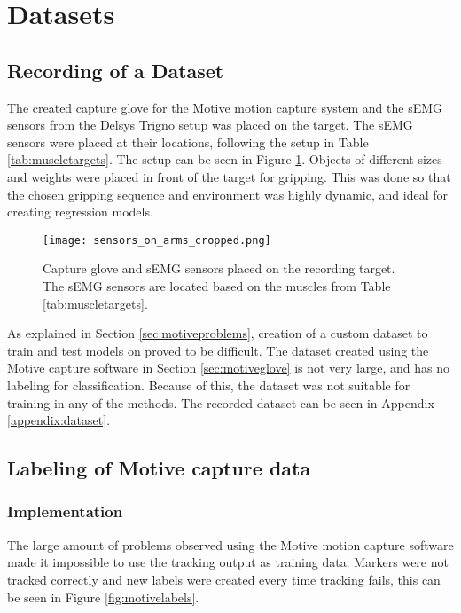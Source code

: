 \documentclass[../main.tex]{subfiles}
\begin{document}
\section{Datasets}

\subsection{Recording of a Dataset}

The created capture glove for the Motive motion capture system \cite{motive} and the sEMG sensors from the Delsys Trigno \cite{trigno} setup was placed on the target.
The sEMG sensors were placed at their locations, following the setup in Table \ref{tab:muscletargets}.
The setup can be seen in Figure \ref{fig:musclesensorsonarm}.
Objects of different sizes and weights were placed in front of the target for gripping. 
This was done so that the chosen gripping sequence and environment was highly dynamic, and ideal for creating regression models.

\begin{figure}[H]
\begin{center}
\texttt{[image: sensors\_on\_arms\_cropped.png]}
\caption{Capture glove and sEMG sensors placed on the recording target. The sEMG sensors are located based on the muscles from Table \ref{tab:muscletargets}.}
\label{fig:musclesensorsonarm}
\end{center}
\end{figure}

As explained in Section \ref{sec:motiveproblems}, creation of a custom dataset to train and test models on proved to be difficult.
The dataset created using the Motive capture software \cite{motive} in Section \ref{sec:motiveglove} is not very large, and has no labeling for classification.
Because of this, the dataset was not suitable for training in any of the methods.
The recorded dataset can be seen in Appendix \ref{appendix:dataset}. 

\subsection{Labeling of Motive capture data}

\subsubsection{Implementation}
\label{sec:motivecleaning}

The large amount of problems observed using the Motive motion capture software \cite{motive} made it impossible to use the tracking output as training data.
Markers were not tracked correctly and new labels were created every time tracking fails, this can be seen in Figure \ref{fig:motivelabels}.
\end{document}
